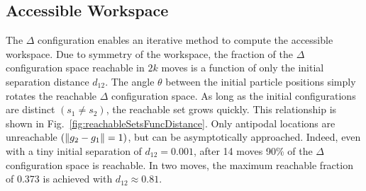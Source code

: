 %



\subsection{Accessible Workspace}

The $\Delta$ configuration enables an iterative method to compute the accessible workspace.  
 Due to symmetry of the workspace, the fraction of the $\Delta$ configuration space reachable in $2 k$ moves is a function of only the initial separation distance $d_{12}$.
 The angle $\theta$ between the initial particle positions simply rotates the reachable $\Delta$ configuration space.
  As long as the initial configurations are distinct $(s_1 \neq s_2)$, the reachable set grows quickly. 
  This relationship is shown in Fig.~\ref{fig:reachableSetsFuncDistance}.
   Only antipodal locations are unreachable $(\left\lVert g_2-g_1\right\rVert = 1)$, but can be asymptotically approached.
   Indeed, even with a tiny initial separation of $d_{12} = 0.001$, after 14 moves 90\% of the $\Delta$ configuration space is reachable. 
   In two moves, the maximum reachable fraction of 0.373 is achieved with $d_{12} \approx 0.81$.
   

